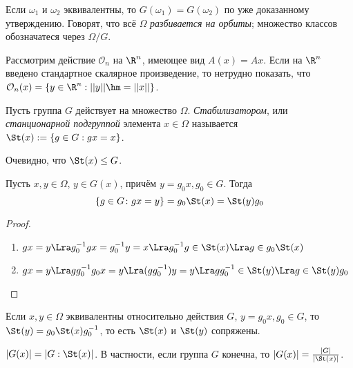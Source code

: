 \begin{note}
	Если $\omega_1$ и $\omega_2$ эквивалентны, то $G(\omega_1) = G(\omega_2)$ по уже доказанному утверждению. Говорят, что всё $\Omega$ \textit{разбивается на орбиты}; множество классов обозначатеся через $\Omega / G$.
\end{note}

\begin{example}
	Рассмотрим действие $\mathcal{O}_n$ на $\R^n$, имеющее вид $A(x) = Ax$. Если на $\R^n$ введено стандартное скалярное произведение, то нетрудно показать, что $\mathcal{O}_n(x) = \{y \in \R^n: ||y|| \hm= ||x||\}$.
\end{example}

\begin{definition}
	Пусть группа $G$ действует на множество $\Omega$. \textit{Стабилизатором}, или \textit{станционарной подгруппой} элемента $x \in \Omega$ называется $\St(x) := \{g \in G: gx = x\}$.
\end{definition}

\begin{note}
	Очевидно, что $\St(x) \le G$.
\end{note}

\begin{proposition}
	Пусть $x, y \in \Omega$, $y \in G(x)$, причём $y = g_0x, g_0 \in G$. Тогда
	\[
		\{g \in G \colon gx = y\} = g_0\St(x) = \St(y)g_0
	\]
\end{proposition}

\begin{proof}~
	\begin{enumerate}
		\item $gx = y \Lra g^{-1}_0gx = g^{-1}_0y = x \Lra g_0^{-1}g \in \St(x) \Lra g \in g_0\St(x)$
		\item $gx = y \Lra gg_0^{-1}g_0x = y \Lra (gg_0^{-1})y = y \Lra gg_0^{-1} \in \St(y) \Lra g \in \St(y)g_0$
	\end{enumerate}
\end{proof}

\begin{corollary}
	Если $x, y \in \Omega$ эквивалентны относительно действия $G$, $y = g_0x, g_0 \in G$, то $\St(y) = g_0\St(x)g_0^{-1}$, то есть $\St(x)$ и $\St(y)$ сопряжены.
\end{corollary}

\begin{corollary}
	$|G(x)| = |G : \St(x)|$. В частности, если группа $G$ конечна, то $|G(x)| = \frac{|G|}{|\St(x)|}$.
\end{corollary}

